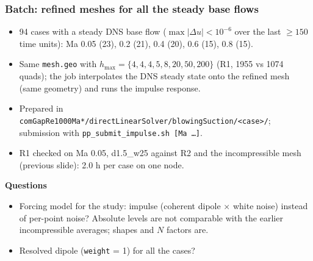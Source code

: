 \documentclass[
  aspectratio=169,
  t,
  onlytextwidth,
  10pt,
]{beamer}
\begin{document}
\begin{frame}
	\frametitle{Batch: refined meshes for all the steady base flows}
	\small
	\begin{itemize}
		\item 94 cases with a steady DNS base flow ($\max|\Delta u|<10^{-6}$ over the last $\ge150$ time units): Ma 0.05 (23), 0.2 (21), 0.4 (20), 0.6 (15), 0.8 (15).
		\item Same \texttt{mesh.geo} with $h_{\max}=\{4,4,4,5,8,20,50,200\}$ (R1, 1955 vs 1074 quads); the job interpolates the DNS steady state onto the refined mesh (same geometry) and runs the impulse response.
		\item Prepared in \texttt{comGapRe1000Ma*/directLinearSolver/blowingSuction/<case>/}; submission with \texttt{pp\_submit\_impulse.sh [Ma \dots]}.
		\item R1 checked on Ma 0.05, d1.5\_w25 against R2 and the incompressible mesh (previous slide): 2.0 h per case on one node.
	\end{itemize}
	\vspace{0.2cm}
	\textbf{Questions}
	\begin{itemize}
		\item Forcing model for the study: impulse (coherent dipole $\times$ white noise) instead of per-point noise? Absolute levels are not comparable with the earlier incompressible averages; shapes and $N$ factors are.
		\item Resolved dipole (\texttt{weight} = 1) for all the cases?
	\end{itemize}
\end{frame}
\end{document}
